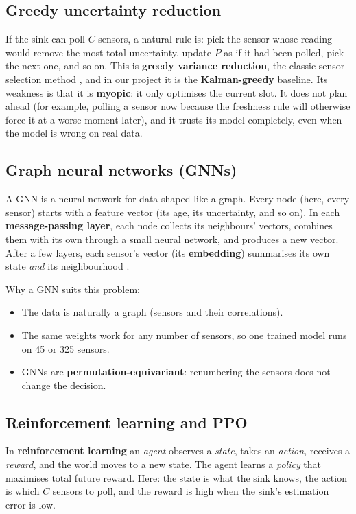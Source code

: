 \subsection{Greedy uncertainty reduction}

If the sink can poll $C$ sensors, a natural rule is: pick the sensor whose reading would remove the most total
uncertainty, update $P$ as if it had been polled, pick the next one, and so on. This is \textbf{greedy variance
reduction}, the classic sensor-selection method \cite{19}, and in our project it is the \textbf{Kalman-greedy}
baseline. Its weakness is that it is \textbf{myopic}: it only optimises the current slot. It does not plan ahead
(for example, polling a sensor now because the freshness rule will otherwise force it at a worse moment later), and
it trusts its model completely, even when the model is wrong on real data.

\subsection{Graph neural networks (GNNs)}

A GNN is a neural network for data shaped like a graph. Every node (here, every sensor) starts with a feature vector
(its age, its uncertainty, and so on). In each \textbf{message-passing layer}, each node collects its neighbours'
vectors, combines them with its own through a small neural network, and produces a new vector. After a few layers,
each sensor's vector (its \textbf{embedding}) summarises its own state \emph{and} its neighbourhood \cite{21,10}.

Why a GNN suits this problem:
\begin{itemize}
  \item The data is naturally a graph (sensors and their correlations).
  \item The same weights work for any number of sensors, so one trained model runs on 45 or 325 sensors.
  \item GNNs are \textbf{permutation-equivariant}: renumbering the sensors does not change the decision.
\end{itemize}

\subsection{Reinforcement learning and PPO}

In \textbf{reinforcement learning} an \emph{agent} observes a \emph{state}, takes an \emph{action}, receives a
\emph{reward}, and the world moves to a new state. The agent learns a \emph{policy} that maximises total future
reward. Here: the state is what the sink knows, the action is which $C$ sensors to poll, and the reward is high when
the sink's estimation error is low.

